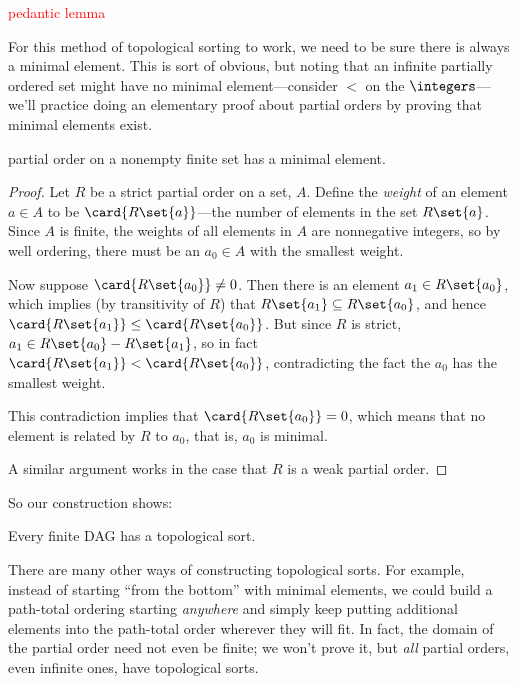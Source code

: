 \begin{editingnotes}
\textcolor{red}{pedantic lemma}

For this method of topological sorting to work, we need to be sure
there is always a minimal element.  This is sort of obvious, but
noting that an infinite partially ordered set might have no minimal
element---consider $<$ on the $\integers$---we'll practice doing an
elementary proof about partial orders by proving that minimal elements
exist.

\begin{lemma}\label{finmin}
   partial order on a nonempty finite set
  has a minimal element.

\begin{proof} Let $R$ be a strict partial order on a set, $A$.  Define the \emph{weight}
of an element $a \in A$ to be $\card{R\set{a}}$---the number of
elements in the set $R\set{a}$.  Since $A$ is finite, the weights of
all elements in $A$ are nonnegative integers, so by well ordering,
there must be an $a_0 \in A$ with the smallest weight.

Now suppose $\card{R\set{a_0}} \neq 0$.  Then there is an element $a_1 \in
R\set{a_0}$, which implies (by transitivity of $R$) that $R\set{a_1}
\subseteq R\set{a_0}$, and hence $\card{R\set{a_1}} \leq
\card{R\set{a_0}}$.  But since $R$ is strict, $a_1 \in R\set{a_0} -
R\set{a_1}$, so in fact $\card{R\set{a_1}} < \card{R\set{a_0}}$,
contradicting the fact the $a_0$ has the smallest weight.

This contradiction implies that $\card{R\set{a_0}} = 0$, which means that
no element is related by $R$ to $a_0$, that is, $a_0$ is minimal.

A similar argument works in the case that $R$ is a weak partial order.

\end{proof}
\end{lemma}

\end{editingnotes}

So our construction shows:

\begin{theorem}\label{thm:topological}
Every finite DAG has a topological sort.
\end{theorem}
\begin{editingnotes}

There are many other ways of constructing topological sorts.  For example,
instead of starting ``from the bottom'' with minimal elements, we could
build a path-total ordering starting \emph{anywhere} and simply keep
putting additional elements into the path-total order wherever they will fit.
In fact, the domain of the partial order need not even be finite; we won't
prove it, but \emph{all} partial orders, even infinite ones, have
topological sorts.
\end{editingnotes}

